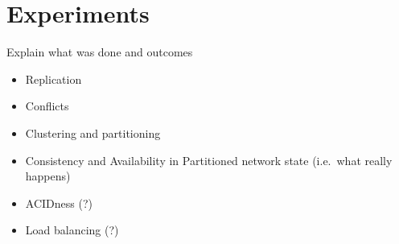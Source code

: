 \section{Experiments}

Explain what was done and outcomes

\begin{itemize}
  \item Replication
  \item Conflicts
  \item Clustering and partitioning
  \item Consistency and Availability in Partitioned network state (i.e.\ what really happens)
  \item ACIDness (?)
  \item Load balancing (?)
\end{itemize}
